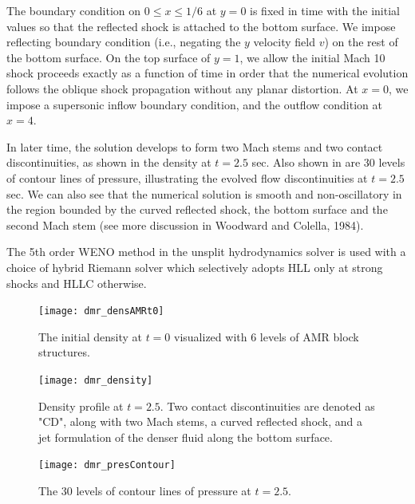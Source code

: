 The boundary condition on $0\le x \le 1/6$ at $y=0$ is fixed in time with the initial values so that the reflected shock
is attached to the bottom surface. We impose reflecting boundary condition (i.e., negating the $y$ velocity field $v$)
on the rest of the bottom surface. On the top surface of $y=1$, we allow the initial Mach 10 shock proceeds
exactly as a function of time in order that the numerical evolution follows the oblique shock propagation without any planar distortion.
At $x=0$, we impose a supersonic inflow boundary condition, and the outflow condition at $x=4$.

In later time, the solution develops to form two Mach stems and two contact discontinuities, 
as shown in  the density at $t=2.5$ sec. Also shown 
in  are 30 levels of contour lines of pressure, 
illustrating the evolved flow discontinuities at $t=2.5$ sec. We can also see that the numerical solution is 
smooth and non-oscillatory in the region bounded by the curved reflected shock, the bottom surface and
the second Mach stem (see more discussion in Woodward and Colella, 1984).


The 5th order WENO method in the unsplit hydrodynamics solver is used with a choice of hybrid Riemann solver which selectively adopts 
HLL only at strong shocks and HLLC otherwise.


\begin{figure}
\begin{center}
{\leavevmode\texttt{[image: dmr\_densAMRt0]}}
\caption{\label{Fig:DMR_densityAMR_t0} The initial density at $t=0$ visualized with 6 levels of AMR block structures.
}
\end{center}
\end{figure}

\begin{figure}
\begin{center}
{\leavevmode\texttt{[image: dmr\_density]}}
\caption{\label{Fig:DMR_density} Density profile at $t=2.5$. Two contact discontinuities are denoted as "CD",
along with two Mach stems, a curved reflected shock, and a jet formulation of the denser fluid along the bottom surface.
}
\end{center}
\end{figure}

\begin{figure}
\begin{center}
{\leavevmode\texttt{[image: dmr\_presContour]}}
\caption{\label{Fig:DMR_presContour} The 30 levels of contour lines of pressure at $t=2.5$.
}
\end{center}
\end{figure}

